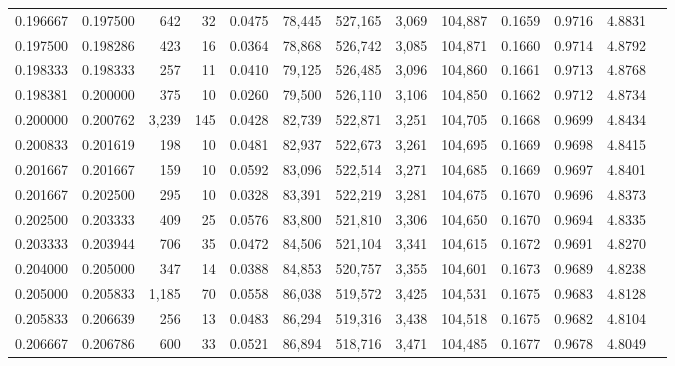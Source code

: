 \begin{tabular}{rrrrrrrrrrrrr}
0.196667 & 0.197500 &   642 &  32 &                                     0.0475 &  78,445 & 527,165 &   3,069 & 104,887 & 0.1659 & 0.9716 & 4.8831 \\
0.197500 & 0.198286 &   423 &  16 &                                     0.0364 &  78,868 & 526,742 &   3,085 & 104,871 & 0.1660 & 0.9714 & 4.8792 \\
0.198333 & 0.198333 &   257 &  11 &                                     0.0410 &  79,125 & 526,485 &   3,096 & 104,860 & 0.1661 & 0.9713 & 4.8768 \\
0.198381 & 0.200000 &   375 &  10 &                                     0.0260 &  79,500 & 526,110 &   3,106 & 104,850 & 0.1662 & 0.9712 & 4.8734 \\
0.200000 & 0.200762 & 3,239 & 145 &                                     0.0428 &  82,739 & 522,871 &   3,251 & 104,705 & 0.1668 & 0.9699 & 4.8434 \\
0.200833 & 0.201619 &   198 &  10 &                                     0.0481 &  82,937 & 522,673 &   3,261 & 104,695 & 0.1669 & 0.9698 & 4.8415 \\
0.201667 & 0.201667 &   159 &  10 &                                     0.0592 &  83,096 & 522,514 &   3,271 & 104,685 & 0.1669 & 0.9697 & 4.8401 \\
0.201667 & 0.202500 &   295 &  10 &                                     0.0328 &  83,391 & 522,219 &   3,281 & 104,675 & 0.1670 & 0.9696 & 4.8373 \\
0.202500 & 0.203333 &   409 &  25 &                                     0.0576 &  83,800 & 521,810 &   3,306 & 104,650 & 0.1670 & 0.9694 & 4.8335 \\
0.203333 & 0.203944 &   706 &  35 &                                     0.0472 &  84,506 & 521,104 &   3,341 & 104,615 & 0.1672 & 0.9691 & 4.8270 \\
0.204000 & 0.205000 &   347 &  14 &                                     0.0388 &  84,853 & 520,757 &   3,355 & 104,601 & 0.1673 & 0.9689 & 4.8238 \\
0.205000 & 0.205833 & 1,185 &  70 &                                     0.0558 &  86,038 & 519,572 &   3,425 & 104,531 & 0.1675 & 0.9683 & 4.8128 \\
0.205833 & 0.206639 &   256 &  13 &                                     0.0483 &  86,294 & 519,316 &   3,438 & 104,518 & 0.1675 & 0.9682 & 4.8104 \\
0.206667 & 0.206786 &   600 &  33 &                                     0.0521 &  86,894 & 518,716 &   3,471 & 104,485 & 0.1677 & 0.9678 & 4.8049 \\

\end{tabular}
